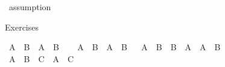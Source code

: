 \begin{isabellebody}
\ assumption%
\endisatagproof
{\isafoldproof}%
%
\isadelimproof
%
\endisadelimproof
%
\begin{isamarkuptext}%
Exercises%
\end{isamarkuptext}\isamarkuptrue%
\isamarkupfalse%
\ {\isachardoublequoteopen}A\ {\isasymand}\ B\ {\isasymlongrightarrow}\ A\ {\isasymlongrightarrow}\ B{\isachardoublequoteclose}\isanewline
%
\isadelimproof
\ \ %
\endisadelimproof
%
\isatagproof
{}\isamarkupfalse%
%
\endisatagproof
{\isafoldproof}%
%
\isadelimproof
\isanewline
%
\endisadelimproof
\isanewline
{}\isamarkupfalse%
\ {\isachardoublequoteopen}{\isacharparenleft}{\kern0pt}A\ {\isasymand}\ B{\isacharparenright}{\kern0pt}\ {\isasymlongrightarrow}\ {\isacharparenleft}{\kern0pt}A\ {\isasymor}\ B{\isacharparenright}{\kern0pt}{\isachardoublequoteclose}\isanewline
%
\isadelimproof
\ \ %
\endisadelimproof
%
\isatagproof
{}\isamarkupfalse%
%
\endisatagproof
{\isafoldproof}%
%
\isadelimproof
\isanewline
%
\endisadelimproof
\isanewline
{}\isamarkupfalse%
{\isachardoublequoteopen}{\isacharparenleft}{\kern0pt}{\isacharparenleft}{\kern0pt}A\ {\isasymlongrightarrow}\ B{\isacharparenright}{\kern0pt}\ {\isasymand}\ {\isacharparenleft}{\kern0pt}B\ {\isasymlongrightarrow}\ A{\isacharparenright}{\kern0pt}{\isacharparenright}{\kern0pt}\ {\isacharequal}{\kern0pt}\ {\isacharparenleft}{\kern0pt}A\ {\isacharequal}{\kern0pt}\ B{\isacharparenright}{\kern0pt}{\isachardoublequoteclose}\isanewline
%
\isadelimproof
\ \ %
\endisadelimproof
%
\isatagproof
{}\isamarkupfalse%
%
\endisatagproof
{\isafoldproof}%
%
\isadelimproof
\ \isanewline
%
\endisadelimproof
\isanewline
{}\isamarkupfalse%
\ {\isachardoublequoteopen}{\isacharparenleft}{\kern0pt}A\ {\isasymlongrightarrow}\ {\isacharparenleft}{\kern0pt}B\ {\isasymand}\ C{\isacharparenright}{\kern0pt}{\isacharparenright}{\kern0pt}\ {\isasymlongrightarrow}\ {\isacharparenleft}{\kern0pt}A\ {\isasymlongrightarrow}\ C{\isacharparenright}{\kern0pt}{\isachardoublequoteclose}\isanewline
%
\isadelimproof
\ \ %
\endisadelimproof
%
\isatagproof
{}\isamarkupfalse%
%
\endisatagproof
{\isafoldproof}%
%
\isadelimproof
\isanewline
%
\endisadelimproof
%
\isadelimtheory
\isanewline
%
\endisadelimtheory
%
\isatagtheory
{}\isamarkupfalse%
%
\endisatagtheory
{\isafoldtheory}%
%
\isadelimtheory
%
\endisadelimtheory
%
\end{isabellebody}%
\endinput
